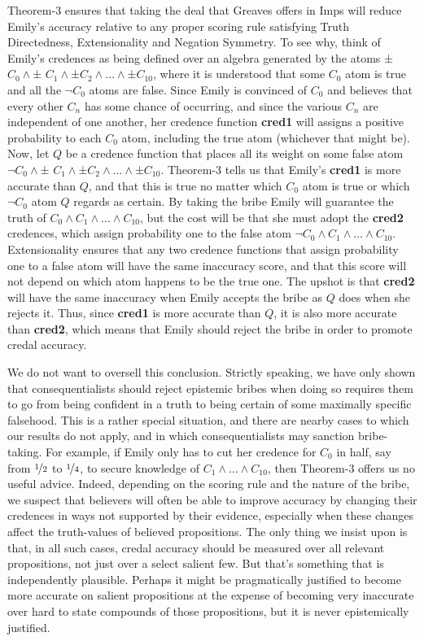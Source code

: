 Theorem-3 ensures that taking the deal that Greaves offers in Imps will reduce Emily's accuracy relative to any proper scoring rule satisfying Truth Directedness, Extensionality and Negation Symmetry.  To see why, think of Emily's credences as being defined over an algebra generated by the atoms ±$C_0 \wedge $± $C_1 \wedge$±$C_2 \wedge \ldots \wedge$±$C_{10}$, where it is understood that some $C_0$ atom is true and all the $\neg C_0$ atoms are false.  Since Emily is convinced of $C_0$ and believes that every other $C_n$ has some chance of occurring, and since the various $C_n$ are independent of one another, her credence function \textbf{cred1} will assigns a positive probability to each $C_0$ atom, including the true atom (whichever that might be).  Now, let $Q$ be a credence function that places all its weight on some false atom $\neg C_0 \wedge $± $C_1 \wedge$±$C_2 \wedge \ldots \wedge$±$C_{10}$.  Theorem-3 tells us that Emily's \textbf{cred1} is more accurate than $Q$, and that this is true no matter which $C_0$ atom is true or which $\neg C_0$ atom $Q$ regards as certain.  By taking the bribe Emily will guarantee the truth of $C_0 \wedge C_1 \wedge \dots \wedge C_{10}$, but the cost will be that she must adopt the \textbf{cred2} credences, which assign probability one to the false atom $\neg C_0 \wedge C_1 \wedge \dots \wedge C_{10}$.  Extensionality ensures that any two credence functions that assign probability one to a false atom will have the same inaccuracy score, and that this score will not depend on which atom happens to be the true one.  The upshot is that \textbf{cred2} will have the same inaccuracy when Emily accepts the bribe as $Q$ does when she rejects it.  Thus, since \textbf{cred1} is more accurate than $Q$, it is also more accurate than \textbf{cred2}, which means that Emily should reject the bribe in order to promote credal accuracy. 

We do not want to oversell this conclusion. Strictly speaking, we have only shown that consequentialists should reject epistemic bribes when doing so requires them to go from being confident in a truth to being certain of some maximally specific falsehood.  This is a rather special situation, and there are nearby cases to which our results do not apply, and in which consequentialists may sanction bribe-taking.  For example, if Emily only has to cut her credence for $C_0$ in half, say from $\nicefrac{1}{2}$ to $\nicefrac{1}{4}$, to secure knowledge of $C_1 \wedge \dots \wedge C_{10}$, then Theorem-3 offers us no useful advice.  Indeed, depending on the scoring rule and the nature of the bribe, we suspect that believers will often be able to improve accuracy by changing their credences in ways not supported by their evidence, especially when these changes affect the truth-values of believed propositions.  The only thing we insist upon is that, in all such cases, credal accuracy should be measured over all relevant propositions, not just over a select salient few. But that's something that is independently plausible. Perhaps it might be pragmatically justified to become more accurate on salient propositions at the expense of becoming very inaccurate over hard to state compounds of those propositions, but it is never epistemically justified. 

